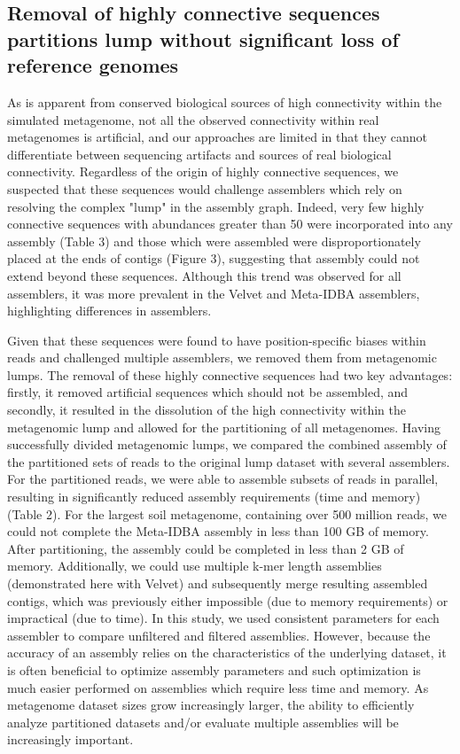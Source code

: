 \documentclass[10pt]{article}
\begin{document}
\subsection*{Removal of highly connective sequences partitions lump without significant loss of reference genomes}

As is apparent from conserved biological sources of high connectivity within the simulated metagenome, not all the observed connectivity within real metagenomes is artificial, and our approaches are limited in that they cannot differentiate between sequencing artifacts and sources of real biological connectivity.  Regardless of the origin of highly connective sequences, we suspected that these sequences would challenge assemblers which rely on resolving the complex "lump" in the assembly graph.  Indeed, very few highly connective sequences with abundances greater than 50 were incorporated into any assembly (Table 3) and those which were assembled were disproportionately placed at the ends of contigs (Figure 3), suggesting that assembly could not extend beyond these sequences.  Although this trend was observed for all assemblers, it was more prevalent in the Velvet and Meta-IDBA assemblers, highlighting differences in assemblers.  

Given that these sequences were found to have position-specific biases within reads and challenged multiple assemblers, we removed them from metagenomic lumps.  The removal of these highly connective sequences had two key advantages:  firstly, it removed artificial sequences which should not be assembled, and secondly, it resulted in the dissolution of the high connectivity within the metagenomic lump and allowed for the partitioning of all metagenomes.  Having successfully divided metagenomic lumps, we compared the combined assembly of the partitioned sets of reads to the original lump dataset with several assemblers.  For the partitioned reads, we were able to assemble subsets of reads in parallel, resulting in significantly reduced assembly requirements (time and memory) (Table 2).  For the largest soil metagenome, containing over 500 million reads, we could not complete the Meta-IDBA assembly in less than 100 GB of memory.  After partitioning, the assembly could be completed in less than 2 GB of memory.  Additionally, we could use multiple k-mer length assemblies (demonstrated here with Velvet) and subsequently merge resulting assembled contigs, which was previously either impossible (due to memory requirements) or impractical (due to time).  In this study, we used consistent parameters for each assembler to compare unfiltered and filtered assemblies.  However, because the accuracy of an assembly relies on the characteristics of the underlying dataset, it is often beneficial to optimize assembly parameters and such optimization is much easier performed on assemblies which require less time and memory.  As metagenome dataset sizes grow increasingly larger, the ability to efficiently analyze partitioned datasets and/or evaluate multiple assemblies will be increasingly important.
\end{document}
